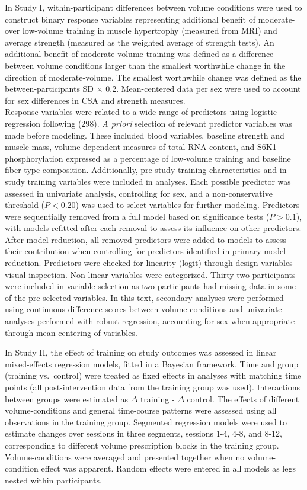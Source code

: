\documentclass[twoside,10pt]{gihclass} %
\begin{document}
In Study I, within-participant differences between volume conditions were used to construct binary response variables representing additional benefit of moderate- over low-volume training in muscle hypertrophy (measured from MRI) and average strength (measured as the weighted average of strength tests). An additional benefit of moderate-volume training was defined as a difference between volume conditions larger than the smallest worthwhile change in the direction of moderate-volume. The smallest worthwhile change was defined as the between-participants SD \(\times\) 0.2. Mean-centered data per sex were used to account for sex differences in CSA and strength measures.\\
Response variables were related to a wide range of predictors using logistic regression following (298). \emph{A priori} selection of relevant predictor variables was made before modeling. These included blood variables, baseline strength and muscle mass, volume-dependent measures of total-RNA content, and S6K1 phosphorylation expressed as a percentage of low-volume training and baseline fiber-type composition. Additionally, pre-study training characteristics and in-study training variables were included in analyses.
Each possible predictor was assessed in univariate analysis, controlling for sex, and a non-conservative threshold (\(P < 0.20\)) was used to select variables for further modeling.
Predictors were sequentially removed from a full model based on significance tests (\(P > 0.1\)), with models refitted after each removal to assess its influence on other predictors. After model reduction, all removed predictors were added to models to assess their contribution when controlling for predictors identified in primary model reduction. Predictors were checked for linearity (logit) through design variables visual inspection. Non-linear variables were categorized. Thirty-two participants were included in variable selection as two participants had missing data in some of the pre-selected variables.
In this text, secondary analyses were performed using continuous difference-scores between volume conditions and univariate analyses performed with robust regression, accounting for sex when appropriate through mean centering of variables.

In Study II, the effect of training on study outcomes was assessed in linear mixed-effects regression models, fitted in a Bayesian framework.
Time and group (training vs.~control) were treated as fixed effects in analyses with matching time points (all post-intervention data from the training group was used).
Interactions between groups were estimated as \(\Delta\) training - \(\Delta\) control.
The effects of different volume-conditions and general time-course patterns were assessed using all observations in the training group.
Segmented regression models were used to estimate changes over sessions in three segments, sessions 1-4, 4-8, and 8-12, corresponding to different volume prescription blocks in the training group.
Volume-conditions were averaged and presented together when no volume-condition effect was apparent.
Random effects were entered in all models as legs nested within participants.
\end{document}

